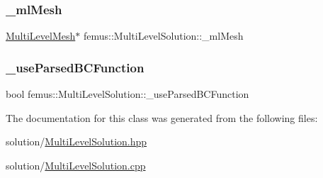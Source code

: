 \subsubsection{\texorpdfstring{\+\_\+ml\+Mesh}{\_mlMesh}}
{\footnotesize\ttfamily \mbox{\hyperlink{classfemus_1_1_multi_level_mesh}{Multi\+Level\+Mesh}}$\ast$ femus\+::\+Multi\+Level\+Solution\+::\+\_\+ml\+Mesh}

\mbox{\label{classfemus_1_1_multi_level_solution_a58feff3cc4013ccce4b3543afe849ddb}} 
\subsubsection{\texorpdfstring{\+\_\+use\+Parsed\+B\+C\+Function}{\_useParsedBCFunction}}
{\footnotesize\ttfamily bool femus\+::\+Multi\+Level\+Solution\+::\+\_\+use\+Parsed\+B\+C\+Function}



The documentation for this class was generated from the following files\+:\begin{DoxyCompactItemize}
\item 
solution/\mbox{\hyperlink{_multi_level_solution_8hpp}{Multi\+Level\+Solution.\+hpp}}\item 
solution/\mbox{\hyperlink{_multi_level_solution_8cpp}{Multi\+Level\+Solution.\+cpp}}\end{DoxyCompactItemize}
